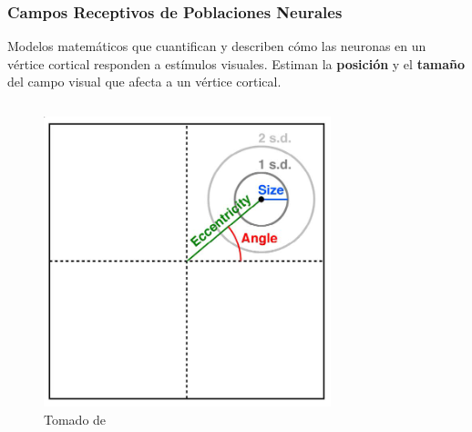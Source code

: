\documentclass[
11pt, %
%
aspectratio=169, %
]{beamer}
\begin{document}
	
\begin{frame}
	\frametitle{Campos Receptivos de Poblaciones Neurales}
	
	\begin{block}{}
		Modelos matemáticos que cuantifican y describen cómo las neuronas en un v\'ertice cortical responden a estímulos visuales. Estiman la \textbf{posición} y el \textbf{tamaño} del campo visual que afecta a un v\'ertice cortical.
	\end{block}
	
	\begin{columns}
		
		\begin{column}{0.5\textwidth}
			\begin{figure}
			\centering
			\captionsetup{font=tiny}
			\includegraphics[scale=0.45]{Graphics/pRF2}
			\caption{Tomado de \cite{benson_human_2018}}
			\end{figure}
		\end{column}
		
		\begin{column}{0.5\textwidth} %
		
			
		\end{column}					
		
	\end{columns}
	
	
	
\end{frame}
\end{document}
